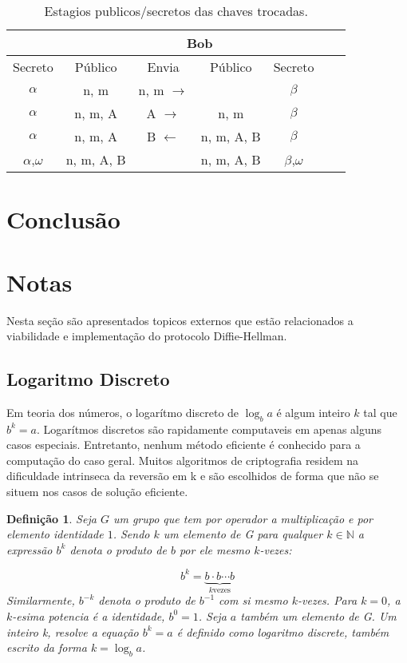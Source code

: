 \documentclass{article}
\newtheorem*{definition}{Definição}
\begin{document}
\begin{table}[ht]
    \centering
    \caption{Estagios publicos/secretos das chaves trocadas.}
    \label{tab:alicebob}
    \begin{tabular}{|c|c|c|c|c|c|c|}
    \hline
    \rowcolor{Gray}
    \multicolumn{2}{|c|}{Alice} &  & \multicolumn{2}{c|}{Bob} \\ \hline
       Secreto      &Público   &Envia           &Público   &Secreto   \\ \hline
       \rowcolor{LightGray}
       $\alpha$       &n, m      &n, m $\rightarrow$&          &$\beta$     \\ \hline
       $\alpha$       &n, m, A   &A $\rightarrow$   &n, m      &$\beta$     \\ \hline
       \rowcolor{LightGray}
       $\alpha$       &n, m, A   &B $\leftarrow$    &n, m, A, B&$\beta$     \\ \hline
       $\alpha$,$\omega$&n, m, A, B&                &n, m, A, B&$\beta$,$\omega$\\ \hline
    \end{tabular}
\end{table}

\section{Conclusão}%
\label{sec:conclusao}

\section{Notas}%
\label{sec:notas}
Nesta seção são apresentados topicos externos que estão relacionados a
viabilidade e implementação do protocolo Diffie-Hellman.

\subsection{Logaritmo Discreto}%
\label{sub:logaritmo_discreto}
Em teoria dos números, o logarítmo discreto de $\log_{b}{a}$ é algum inteiro
$k$ tal que $b^k=a$. Logarítmos discretos são rapidamente computaveis em apenas
alguns casos especiais. Entretanto, nenhum método eficiente é conhecido para
a computação do caso geral. Muitos algoritmos de criptografia residem na
dificuldade intrinseca da reversão em k e são escolhidos de forma que não se
situem nos casos de solução eficiente.

\begin{definition}
    Seja $G$ um grupo que tem por operador a multiplicação e por elemento
    identidade $1$. Sendo $k$ um elemento de G para qualquer
    $k \in \mathbb{N}$ a expressão $b^k$ denota o produto de $b$ por ele mesmo
    $k$-vezes:

    \[
    b^{k}=\underbrace{b\cdot b\cdots b}_{k\text{vezes}}
    \]
    Similarmente, $b^{-k}$ denota o produto de $b^{-1}$ com si mesmo $k$-vezes.
    Para $k=0$, a $k$-esima potencia é a identidade, $b^0=1$. Seja $a$ também
    um elemento de G. Um inteiro k, resolve a equação $b^k=a$ é definido como
    logaritmo discrete, também escrito da forma $k=\log_b{a}$.
\end{definition}
\end{document}
